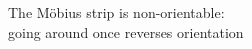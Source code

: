 \documentclass[preview]{standalone}
\begin{document}
\begin{center}
The Möbius strip is non-orientable:\\going around once reverses orientation
\end{center}
\end{document}
